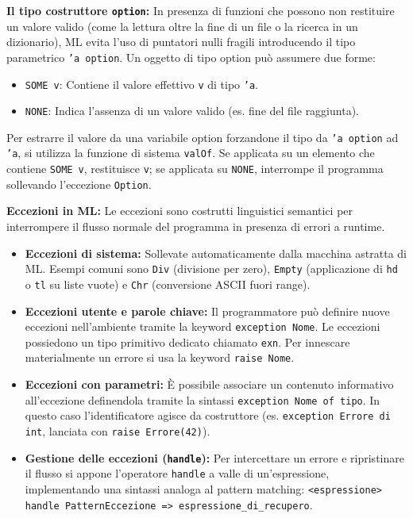 \documentclass[12pt, a4paper]{article}
\begin{document}
\textbf{Il tipo costruttore \texttt{option}:}
In presenza di funzioni che possono non restituire un valore valido (come la lettura oltre la fine di un file o la ricerca in un dizionario), ML evita l'uso di puntatori nulli fragili introducendo il tipo parametrico \texttt{'a option}. Un oggetto di tipo option può assumere due forme:
\begin{itemize}
    \item \texttt{SOME v}: Contiene il valore effettivo \texttt{v} di tipo \texttt{'a}.
    \item \texttt{NONE}: Indica l'assenza di un valore valido (es. fine del file raggiunta).
\end{itemize}
Per estrarre il valore da una variabile option forzandone il tipo da \texttt{'a option} ad \texttt{'a}, si utilizza la funzione di sistema \texttt{valOf}. Se applicata su un elemento che contiene \texttt{SOME v}, restituisce \texttt{v}; se applicata su \texttt{NONE}, interrompe il programma sollevando l'eccezione \texttt{Option}.

\textbf{Eccezioni in ML:}
Le eccezioni sono costrutti linguistici semantici per interrompere il flusso normale del programma in presenza di errori a runtime.
\begin{itemize}
    \item \textbf{Eccezioni di sistema:} Sollevate automaticamente dalla macchina astratta di ML. Esempi comuni sono \texttt{Div} (divisione per zero), \texttt{Empty} (applicazione di \texttt{hd} o \texttt{tl} su liste vuote) e \texttt{Chr} (conversione ASCII fuori range).
    \item \textbf{Eccezioni utente e parole chiave:} Il programmatore può definire nuove eccezioni nell'ambiente tramite la keyword \texttt{exception Nome}. Le eccezioni possiedono un tipo primitivo dedicato chiamato \texttt{exn}. Per innescare materialmente un errore si usa la keyword \texttt{raise Nome}.
    \item \textbf{Eccezioni con parametri:} È possibile associare un contenuto informativo all'eccezione definendola tramite la sintassi \texttt{exception Nome of tipo}. In questo caso l'identificatore agisce da costruttore (es. \texttt{exception Errore di int}, lanciata con \texttt{raise Errore(42)}).
    \item \textbf{Gestione delle eccezioni (\texttt{handle}):} Per intercettare un errore e ripristinare il flusso si appone l'operatore \texttt{handle} a valle di un'espressione, implementando una sintassi analoga al pattern matching: \texttt{<espressione> handle PatternEccezione => espressione\_di\_recupero}.
\end{itemize}
\end{document}
